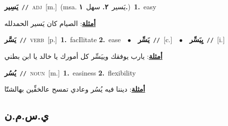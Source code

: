 \documentclass[10pt,a4paper,twoside]{article} %
\begin{document}
\begin{multicols}{2}
{\setlength\topsep{0pt}\textbf{\foreignlanguage{arabic}{يَسِير}}\ {\color{gray}\texttt{//}\color{black}}\ \textsc{adj}\ [m.]\ \color{gray}(msa. \foreignlanguage{arabic}{يَسير}~\foreignlanguage{arabic}{\textbf{٢.}}  \foreignlanguage{arabic}{سهل}~\foreignlanguage{arabic}{\textbf{١.}})\color{black}\ \textbf{1.}~easy\  \begin{flushright}\color{gray}\foreignlanguage{arabic}{\textbf{\underline{\foreignlanguage{arabic}{أمثلة}}}: الصيام كان يَسير الحمدلله}\end{flushright}\color{black}} \vspace{2mm}

{\setlength\topsep{0pt}\textbf{\foreignlanguage{arabic}{يَسَّر}}\ {\color{gray}\texttt{//}\color{black}}\ \textsc{verb}\ [p.]\ \textbf{1.}~facIlitate  \textbf{2.}~ease\ \ $\bullet$\ \ \setlength\topsep{0pt}\textbf{\foreignlanguage{arabic}{يَسِّر}}\ {\color{gray}\texttt{//}\color{black}}\ [c.]\ \ $\bullet$\ \ \setlength\topsep{0pt}\textbf{\foreignlanguage{arabic}{يِيَسِّر}}\ {\color{gray}\texttt{//}\color{black}}\ [i.]\  \begin{flushright}\color{gray}\foreignlanguage{arabic}{\textbf{\underline{\foreignlanguage{arabic}{أمثلة}}}: يارب يوفقك وييَسِّر كل أمورك يا خالد يا ابن بطني}\end{flushright}\color{black}} \vspace{2mm}

{\setlength\topsep{0pt}\textbf{\foreignlanguage{arabic}{يُسُر}}\ {\color{gray}\texttt{//}\color{black}}\ \textsc{noun}\ [m.]\ \textbf{1.}~easiness  \textbf{2.}~flexibility\  \begin{flushright}\color{gray}\foreignlanguage{arabic}{\textbf{\underline{\foreignlanguage{arabic}{أمثلة}}}: ديننا فيه يُسُر وعادي تمسح عالخفِّين بهالشتّا}\end{flushright}\color{black}} \vspace{2mm}

\vspace{-3mm}
\subsection*{\color{blue}\foreignlanguage{arabic}{ي.س.م.ن}\color{blue}{ (ntws)}} 


\end{multicols}
\end{document}

